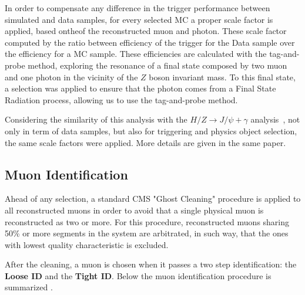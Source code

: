 In order to compensate any difference in the trigger performance between simulated and data samples, for every selected MC a proper scale factor is applied, based onthe\PT of the reconstructed muon and photon. These scale factor computed by the ratio between efficiency of the trigger for the Data sample over the efficiency for a MC sample. These efficiencies are calculated with the tag-and-probe method, exploring the resonance of a final state composed by two muon and one photon in the vicinity of the $Z$ boson invariant mass. To this final state, a selection was applied to ensure that the photon comes from a Final State Radiation process, allowing us to use the tag-and-probe method.

Considering the similarity of this analysis with the $H/Z \rightarrow J/\psi + \gamma$ analysis~\cite{papper_jpsi}, not only in term of data samples, but also for triggering and physics object selection, the same scale factors were applied. More details are given in the same paper.

\subsection{Muon Identification}
\label{sec:muon_id}

Ahead of any selection, a standard CMS "Ghost Cleaning" procedure is applied to all reconstructed muons in order to avoid that a single physical muon is reconstructed as two or more. For this procedure, reconstructed muons sharing 50\% or more segments in the system are arbitrated, in such way, that the ones with lowest quality characteristic is excluded.

After the cleaning, a muon is chosen when it passes a two step identification: the \textbf{Loose ID} and the \textbf{Tight ID}. Below the muon identification procedure is summarized .


